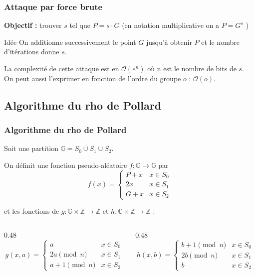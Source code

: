 \documentclass[
	11pt, %
]{beamer}
\begin{document}
\begin{frame}
	\frametitle{Attaque par force brute}
	\textbf{Objectif :} trouver $s$ tel que $P = s \cdot G$ (en notation multiplicative on a $P = G^s$ )

	\bigskip
	
	\begin{block}{Idée}
	On additionne successivement le point $G$
	jusqu'à obtenir $P$ et le nombre d'itérations donne $s$.
	\end{block}
	
	\bigskip

	La complexité de cette attaque est en $\mathcal{O} (e^{n})$ où n est le nombre de bits de $s$. \\
	On peut aussi l'exprimer en fonction de l'ordre du groupe $o$ : $\mathcal{O} (o)$.  

\end{frame}

\subsection{Algorithme du rho de Pollard}

\begin{frame}
	\frametitle{Algorithme du rho de Pollard}

	Soit une partition $\mathbb{G} = S_0 \cup S_1 \cup S_2$.
 
	On définit une fonction pseudo-aléatoire \underline{$f : \mathbb{G} \to \mathbb{G}$} par
	\[
		f(x) =
		\begin{cases}
			P + x  & x \in S_0 \\
			2x         & x \in S_1 \\
			G + x & x \in S_2
		\end{cases}
	\]
	
	et les fonctions de \underline{$g : \mathbb{G} \times \mathbb{Z} \to \mathbb{Z}$}
	et \underline{$h : \mathbb{G} \times \mathbb{Z} \to \mathbb{Z}$} :
  
	\begin{columns}[t]
		\begin{column}{0.48\textwidth}
			\small
			\[
				g(x, a) =
				\begin{cases}
					a             & x \in S_0 \\
					2a \pmod{n}   & x \in S_1 \\
					a+1 \pmod{n}  & x \in S_2
				\end{cases}
			\]
		\end{column}
		\begin{column}{0.48\textwidth}
			\small
			\[
				h(x, b) =
				\begin{cases}
					b+1 \pmod{n}  & x \in S_0 \\
					2b \pmod{n}   & x \in S_1 \\
					b             & x \in S_2
				\end{cases}
			\]
		\end{column}
	\end{columns}

\end{frame}
\end{document}
